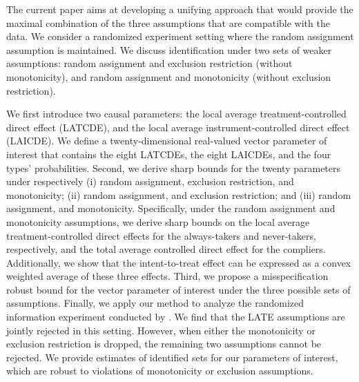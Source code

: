 \documentclass[12pt]{article}
\theoremstyle{plain}
\theoremstyle{definition}
\theoremstyle{remark}
\begin{document}
The current paper aims at developing a unifying approach that would provide the maximal combination of the three assumptions that are compatible with the data. We consider a randomized experiment setting where the random assignment assumption is maintained. We discuss identification under two sets of weaker assumptions: random assignment and exclusion restriction (without monotonicity), and random assignment and monotonicity (without exclusion restriction). 

We first introduce two causal parameters: the local average treatment-controlled direct effect (LATCDE), and the local average instrument-controlled direct effect (LAICDE). We define a twenty-dimensional real-valued vector parameter of interest that contains the eight LATCDEs, the eight LAICDEs, and the four types' probabilities. Second, we derive sharp bounds for the twenty parameters under respectively (i) random assignment, exclusion restriction, and monotonicity; (ii) random assignment, and exclusion restriction; and (iii) random assignment, and monotonicity. Specifically, under the random assignment and monotonicity assumptions, we derive sharp bounds on the local average treatment-controlled direct effects for the always-takers and never-takers, respectively, and the total average controlled direct effect for the compliers. Additionally, we show that the intent-to-treat effect can be expressed as a convex weighted average of these three effects. Third, we propose a misspecification robust bound for the vector parameter of interest under the three possible sets of assumptions. Finally, we apply our method to analyze the randomized information experiment conducted by \cite{bursztyn2020misperceived}. We find that the LATE assumptions are jointly rejected in this setting. However, when either the monotonicity or exclusion restriction is dropped, the remaining two assumptions cannot be rejected. We provide estimates of identified sets for our parameters of interest, which are robust to violations of monotonicity or exclusion assumptions.



\end{document}
